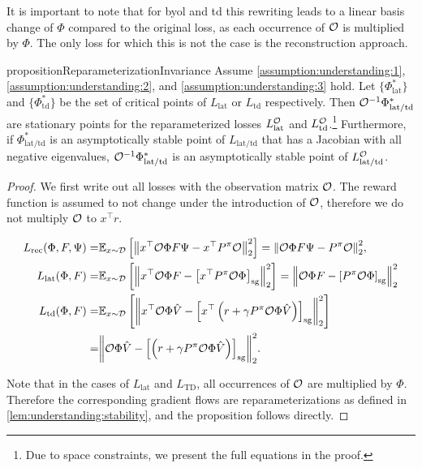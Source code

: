 It is important to note that for \ac{byol} and \ac{td} this rewriting leads to a linear basis change of $\Phi$ compared to the original loss, as each occurrence of ${\mathcal{O}}$ is multiplied by $\Phi$. The only loss for which this is not the case is the reconstruction approach.

\begin{restatable}{proposition}{ReparameterizationInvariance} 
Assume \autoref{assumption:understanding:1}, \autoref{assumption:understanding:2}, and \autoref{assumption:understanding:3} hold. Let $\{\Phi^*_\mathrm{lat}\}$ and ${\{\Phi^*_\mathrm{td}\}}$ be the set of critical points of $L_\mathrm{lat}$ or $L_\mathrm{td}$ respectively.
Then ${\mathcal{O}}^{-1}\Phi^*_\mathrm{lat/td}$ are stationary points for the reparameterized losses $L_\mathrm{lat}^{\mathcal{O}}$ and $L_\mathrm{td}^{\mathcal{O}}$.\footnote{Due to space constraints, we present the full equations in the proof.} Furthermore, if $\Phi^*_\mathrm{lat/td}$ is an asymptotically stable point of $L_\mathrm{lat/td}$ that has a Jacobian with all negative eigenvalues, ${\mathcal{O}}^{-1}\Phi^*_\mathrm{lat/td}$ is an asymptotically stable point of $L_\mathrm{lat/td}^{\mathcal{O}}$.
\end{restatable}
\begin{proof}
We first write out all losses with the observation matrix ${\mathcal{O}}$. The reward function is assumed to not change under the introduction of ${\mathcal{O}}$, therefore we do not multiply ${\mathcal{O}}$ to $x^\top r$.

\begin{align}
    L_{\text{rec}}(\Phi,F,\Psi) =& \mathbb{E}_{x \sim \mathcal{D}}\left[  \left\lVert x^\top {\mathcal{O}} \Phi F \Psi - x^\top {P^\pi}{\mathcal{O}} \right\rVert_2^2 \right] = {\left\lVert {\mathcal{O}} \Phi F \Psi - {P^\pi}{\mathcal{O}} \right\rVert_2^2}, \\
    L_{\text{lat}}(\Phi,F) =& \mathbb{E}_{x \sim \mathcal{D}}\left[  \left\lVert x^\top {\mathcal{O}} \Phi F - \left[x^\top {P^\pi} {\mathcal{O}} \Phi\right]_{\mathrm{sg}} \right\rVert_2^2 \right] = \left\lVert {\mathcal{O}} \Phi F - \left[{P^\pi} {\mathcal{O}} \Phi\right]_{\mathrm{sg}} \right\rVert_2^2 \\
    L_{\text{td}}(\Phi,F) =& \mathbb{E}_{x \sim \mathcal{D}}\left[  \left\lVert x^\top{\mathcal{O}}\Phi \hat{V} - \left[x^\top \left(r + \gamma P^\pi {\mathcal{O}}\Phi \hat{V}\right)\right]_{\mathrm{sg}} \right\rVert_2^2 \right] \\=& {\left\lVert {\mathcal{O}}\Phi \hat{V} - \left[\left(r + \gamma P^\pi {\mathcal{O}}\Phi \hat{V}\right)\right]_{\mathrm{sg}} \right\rVert_2^2}.
\end{align}

Note that in the cases of $L_{\text{lat}}$ and $L_\text{TD}$, all occurrences of ${\mathcal{O}}$ are multiplied by $\Phi$.
Therefore the corresponding gradient flows are reparameterizations as defined in \autoref{lem:understanding:stability}, and the proposition follows directly.
\end{proof}

